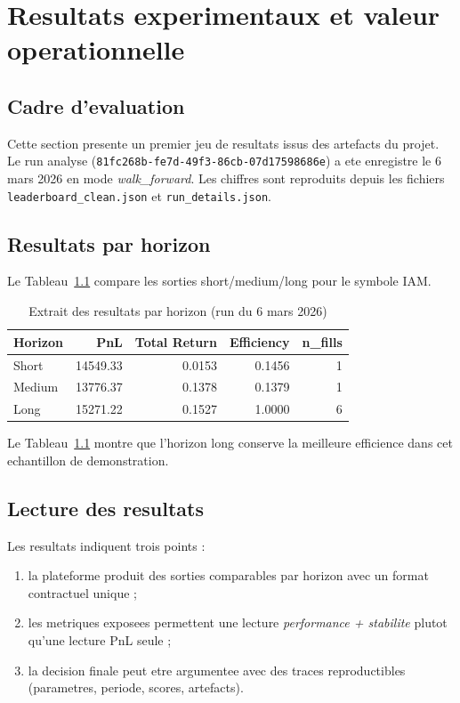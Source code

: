 \chapter{Resultats experimentaux et valeur operationnelle}

\section{Cadre d'evaluation}
Cette section presente un premier jeu de resultats issus des artefacts du projet.
Le run analyse (\texttt{81fc268b-fe7d-49f3-86cb-07d17598686e}) a ete enregistre
le 6 mars 2026 en mode \textit{walk\_forward}. Les chiffres sont reproduits depuis
les fichiers \texttt{leaderboard\_clean.json} et \texttt{run\_details.json}.

\section{Resultats par horizon}
Le Tableau~\ref{tab:results-horizon} compare les sorties short/medium/long pour
le symbole IAM.

\begin{table}[H]
\centering
\caption{Extrait des resultats par horizon (run du 6 mars 2026)}
\label{tab:results-horizon}
\begin{tabular}{lrrrr}
\toprule
\textbf{Horizon} & \textbf{PnL} & \textbf{Total Return} & \textbf{Efficiency} & \textbf{n\_fills} \\
\midrule
Short & 14549.33 & 0.0153 & 0.1456 & 1 \\
Medium & 13776.37 & 0.1378 & 0.1379 & 1 \\
Long & 15271.22 & 0.1527 & 1.0000 & 6 \\
\bottomrule
\end{tabular}
\end{table}

Le Tableau~\ref{tab:results-horizon} montre que l'horizon long conserve la
meilleure efficience dans cet echantillon de demonstration.

\section{Lecture des resultats}
Les resultats indiquent trois points :
\begin{enumerate}
\item la plateforme produit des sorties comparables par horizon avec un format
contractuel unique ;
\item les metriques exposees permettent une lecture \textit{performance + stabilite}
plutot qu'une lecture PnL seule ;
\item la decision finale peut etre argumentee avec des traces
reproductibles (parametres, periode, scores, artefacts).
\end{enumerate}


